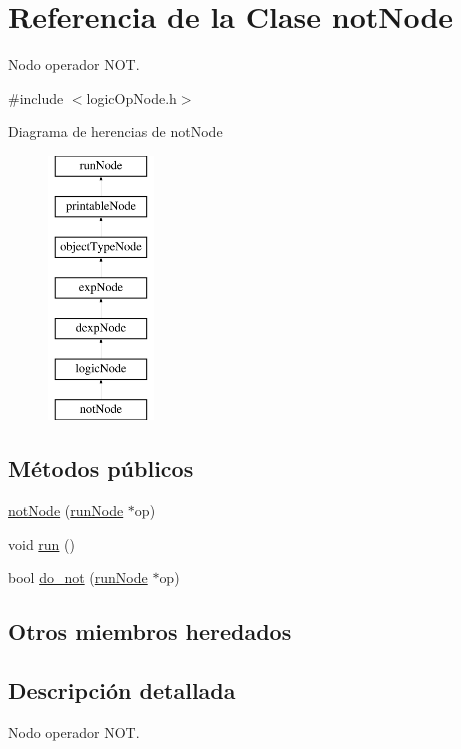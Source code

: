 \hypertarget{classnotNode}{\section{Referencia de la Clase not\-Node}
\label{classnotNode}
}


Nodo operador N\-O\-T.  




{\ttfamily \#include $<$logic\-Op\-Node.\-h$>$}

Diagrama de herencias de not\-Node\begin{figure}[H]
\begin{center}
\leavevmode
\includegraphics[height=7.000000cm]{classnotNode}
\end{center}
\end{figure}
\subsection*{Métodos públicos}
\begin{DoxyCompactItemize}
\item 
\hyperlink{classnotNode_ac3ba7950c8866c62cfae4b4c729ed4de}{not\-Node} (\hyperlink{classrunNode}{run\-Node} $\ast$op)
\item 
void \hyperlink{classnotNode_a1a0cfd8402c4223615b1333998e7b13d}{run} ()
\item 
bool \hyperlink{classnotNode_a6d06adfb17e49e7853fbdf834bafafc9}{do\-\_\-not} (\hyperlink{classrunNode}{run\-Node} $\ast$op)
\end{DoxyCompactItemize}
\subsection*{Otros miembros heredados}


\subsection{Descripción detallada}
Nodo operador N\-O\-T. 

